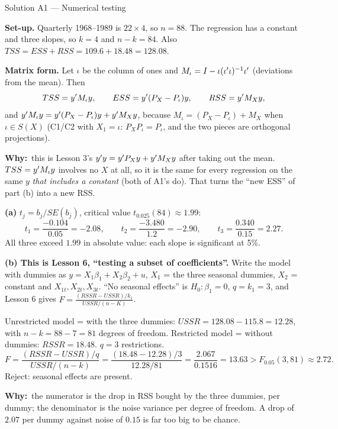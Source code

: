 \documentclass[11pt]{article}
\newcommand{\step}[1]{\par\smallskip\noindent\textbf{\textcolor{qnavy}{#1}}\quad\ignorespaces}
\newcommand{\Why}{\textbf{\textcolor{whyline}{Why:}}\ }
\begin{document}
\begin{solbox}{Solution A1 --- Numerical testing}
\step{Set-up.} Quarterly 1968--1989 is $22 \times 4$, so $n = 88$. The regression has a
constant and three slopes, so $k = 4$ and $n - k = 84$. Also
$TSS = ESS + RSS = 109.6 + 18.48 = 128.08$.
\step{Matrix form.} Let $\iota$ be the column of ones and
$M_{\iota} = I - \iota(\iota^{\prime}\iota)^{-1}\iota^{\prime}$ (deviations from the mean). Then
\[
  TSS = y^{\prime} M_{\iota}y, \qquad ESS = y^{\prime}(P_{X} - P_{\iota})y, \qquad RSS = y^{\prime} M_{X}y,
\]
and $y^{\prime} M_{\iota}y = y^{\prime}(P_{X} - P_{\iota})y + y^{\prime} M_{X}y$, because
$M_{\iota} = (P_{X} - P_{\iota}) + M_{X}$ when $\iota \in S(X)$ (C1/C2 with $X_{1} = \iota$:
$P_{X}P_{\iota} = P_{\iota}$, and the two pieces are orthogonal projections).
\begin{why}\Why this is Lesson 3's $y^{\prime} y = y^{\prime} P_{X}y + y^{\prime} M_{X}y$ after taking out the
mean. $TSS = y^{\prime} M_{\iota}y$ involves no $X$ at all, so it is the same for every regression
on the same $y$ \emph{that includes a constant} (both of A1's do). That turns the ``new ESS''
of part (b) into a new RSS.\end{why}

\step{(a)} $t_{j} = b_{j}/SE(b_{j})$, critical value $t_{0.025}(84) \approx 1.99$:
\[
  t_{1} = \frac{-0.104}{0.05} = -2.08, \qquad
  t_{2} = \frac{-3.480}{1.2} = -2.90, \qquad
  t_{3} = \frac{0.340}{0.15} = 2.27 .
\]
All three exceed $1.99$ in absolute value: each slope is significant at 5\%.

\step{(b) This is Lesson 6, ``testing a subset of coefficients''.} Write the model with
dummies as $y = X_{1}\beta_{1} + X_{2}\beta_{2} + u$, $X_{1}$ = the three seasonal dummies,
$X_{2}$ = constant and $X_{1t}, X_{2t}, X_{3t}$. ``No seasonal effects'' is $H_{0}: \beta_{1} = 0$,
$q = k_{1} = 3$, and Lesson 6 gives $F = \frac{(RSSR - USSR)/k_{1}}{USSR/(n-K)}$.
\par\noindent Unrestricted model = with the three dummies:
$USSR = 128.08 - 115.8 = 12.28$, with $n - k = 88 - 7 = 81$ degrees of freedom.
Restricted model = without dummies: $RSSR = 18.48$. $q = 3$ restrictions.
\[
  F = \frac{(RSSR - USSR)/q}{USSR/(n-k)} = \frac{(18.48 - 12.28)/3}{12.28/81}
    = \frac{2.067}{0.1516} = 13.63 > F_{0.05}(3,81) \approx 2.72 .
\]
Reject: seasonal effects are present.
\begin{why}\Why the numerator is the drop in RSS bought by the three dummies, per
dummy; the denominator is the noise variance per degree of freedom. A drop of $2.07$
per dummy against noise of $0.15$ is far too big to be chance.\end{why}


\end{solbox}
\end{document}

